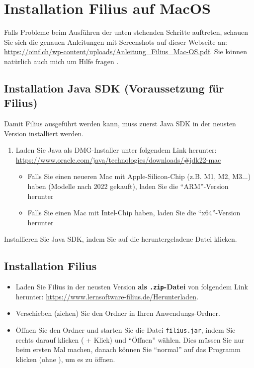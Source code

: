 \section{Installation Filius auf MacOS}
\begin{mycaution}
Falls Probleme beim Ausführen der unten stehenden Schritte auftreten, schauen Sie sich die genauen Anleitungen mit Screenshots auf dieser Webseite an: \url{https://oinf.ch/wp-content/uploads/Anleitung_Filius_Mac-OS.pdf}. Sie können natürlich auch mich um Hilfe fragen .
\end{mycaution}
\subsection{Installation Java SDK (Voraussetzung für Filius)}
Damit Filius ausgeführt werden kann, muss zuerst Java SDK in der neusten Version installiert werden.
\begin{enumerate}
\item Laden Sie Java als DMG-Installer unter folgendem Link herunter: \url{https://www.oracle.com/java/technologies/downloads/#jdk22-mac} 
\begin{itemize}
\item Falls Sie einen neueren Mac mit Apple-Silicon-Chip (z.B. M1, M2, M3...) haben (Modelle nach 2022 gekauft), laden Sie die ``ARM''-Version herunter
\item Falls Sie einen Mac mit Intel-Chip haben, laden Sie die ``x64''-Version herunter
\end{itemize}
\end{enumerate}

Installieren Sie Java SDK, indem Sie auf die heruntergeladene Datei klicken.

\subsection{Installation Filius}

\begin{itemize}
\item Laden Sie Filius in der neusten Version \textbf{als \texttt{.zip}-Datei} von folgendem Link herunter: \url{https://www.lernsoftware-filius.de/Herunterladen}. 
\item Verschieben (ziehen) Sie den Ordner in Ihren Anwendungs-Ordner.
\item Öffnen Sie den Ordner und starten Sie die Datei \texttt{filius.jar}, indem Sie rechts darauf klicken (\keys{\Alt} + Klick) und ``Öffnen'' wählen. Dies müssen Sie nur beim ersten Mal machen, danach können Sie ``normal'' auf das Programm klicken (ohne \keys{\Alt}), um es zu öffnen.
\end{itemize}

